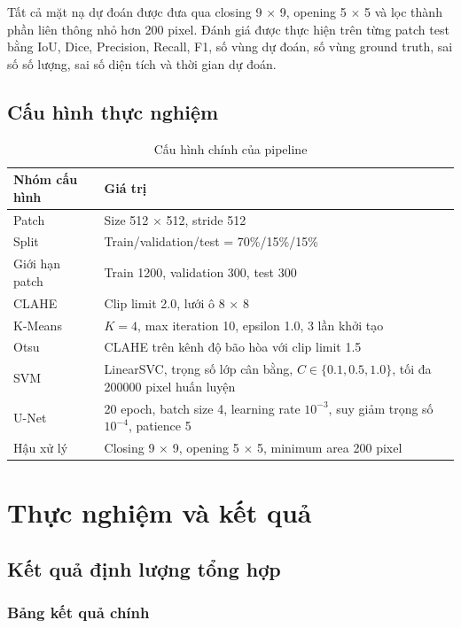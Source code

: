 \documentclass[12pt,a4paper]{report}
\begin{document}
Tất cả mặt nạ dự đoán được đưa qua closing 9 $\times$ 9, opening 5 $\times$ 5 và lọc thành phần liên thông nhỏ hơn 200 pixel. Đánh giá được thực hiện trên từng patch test bằng IoU, Dice, Precision, Recall, F1, số vùng dự đoán, số vùng ground truth, sai số số lượng, sai số diện tích và thời gian dự đoán.

\section{Cấu hình thực nghiệm}

\begin{table}[htbp]
\centering
\caption{Cấu hình chính của pipeline}
\label{tab:config}
\small
\begin{tabular}{|p{5.2cm}|p{8.8cm}|}
\hline
\textbf{Nhóm cấu hình} & \textbf{Giá trị}\\
\hline
Patch & Size 512 $\times$ 512, stride 512\\
\hline
Split & Train/validation/test = 70\%/15\%/15\%\\
\hline
Giới hạn patch & Train 1200, validation 300, test 300\\
\hline
CLAHE & Clip limit 2.0, lưới ô 8 $\times$ 8\\
\hline
K-Means & $K=4$, max iteration 10, epsilon 1.0, 3 lần khởi tạo\\
\hline
Otsu & CLAHE trên kênh độ bão hòa với clip limit 1.5\\
\hline
SVM & LinearSVC, trọng số lớp cân bằng, $C \in \{0.1,0.5,1.0\}$, tối đa 200000 pixel huấn luyện\\
\hline
U-Net & 20 epoch, batch size 4, learning rate $10^{-3}$, suy giảm trọng số $10^{-4}$, patience 5\\
\hline
Hậu xử lý & Closing 9 $\times$ 9, opening 5 $\times$ 5, minimum area 200 pixel\\
\hline
\end{tabular}
\end{table}

\chapter{Thực nghiệm và kết quả}

\section{Kết quả định lượng tổng hợp}

\subsection{Bảng kết quả chính}
\end{document}
